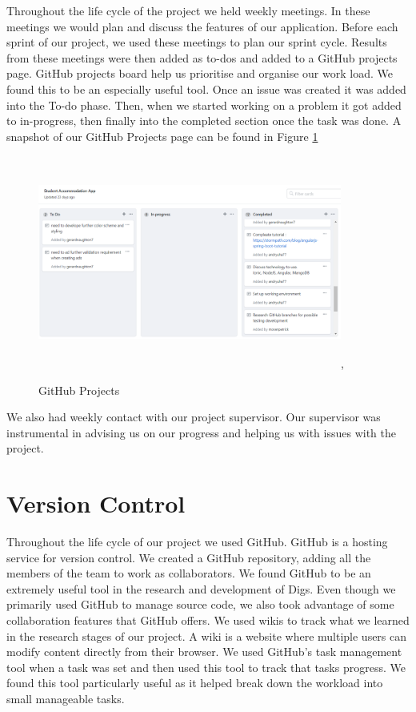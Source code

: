\noindent Throughout the life cycle of the project we held weekly meetings. In these meetings we would plan and discuss the features of our application. Before each sprint of our project, we used these meetings to plan our sprint cycle. Results from these meetings were then added as to-dos and added to a GitHub projects page. GitHub projects board help us prioritise and organise our work load. We found this to be an especially useful tool. Once an issue was created it was added into the To-do phase. Then, when we started working on a problem it got added to in-progress, then finally into the completed section once the task was done. A snapshot of our GitHub Projects page can be found in Figure \ref{github_projects}  \\

\begin{figure}[h]
\centering
\includegraphics[width=10cm, height=7cm]{img/github_projects.PNG},
\caption{GitHub Projects}
\label{github_projects}
\end{figure}

\noindent We also had weekly contact with our project supervisor. Our supervisor was instrumental in advising us on our progress and helping us with issues with the project.

\section{Version Control}
Throughout the life cycle of our project we used GitHub. GitHub is a hosting service for version control. We created a GitHub repository, adding all the members of the team to work as collaborators. We found GitHub to be an extremely useful tool in the research and development of Digs. Even though we primarily used GitHub to manage source code, we also took advantage of some collaboration features that GitHub offers. We used wikis to track what we learned in the research stages of our project. A wiki is a website where multiple users can modify content directly from their browser. We used GitHub’s task management tool when a task was set and then used this tool to track that tasks progress.  We found this tool particularly useful as it helped break down the workload into small manageable tasks.

